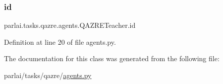 \subsubsection{\texorpdfstring{id}{id}}
{\footnotesize\ttfamily parlai.\+tasks.\+qazre.\+agents.\+Q\+A\+Z\+R\+E\+Teacher.\+id}



Definition at line 20 of file agents.\+py.



The documentation for this class was generated from the following file\+:\begin{DoxyCompactItemize}
\item 
parlai/tasks/qazre/\hyperlink{parlai_2tasks_2qazre_2agents_8py}{agents.\+py}\end{DoxyCompactItemize}
